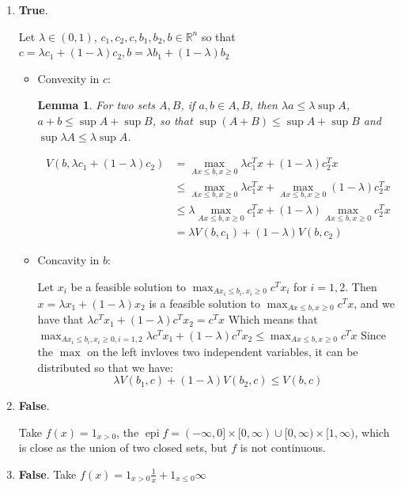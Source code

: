 \documentclass[12pt]{article}
\DeclareMathOperator{\epi}{epi}
\newtheorem{lemma}[theorem]{Lemma}
\begin{document}
\begin{enumerate}
\item[2.]
  \textbf{True}.
  
  Let $\lambda \in (0, 1)$, $c_1, c_2, c, b_1, b_2, b \in \mathbb R^n$ so that $c = \lambda c_1 + (1-\lambda)c_2, b = \lambda b_1 + (1-\lambda)b_2$
  \begin{itemize}
  \item
    Convexity in $c$:
    
    \begin{lemma}
      For two sets $A, B$, if $a, b \in A, B$, then $\lambda a \le \lambda \sup A$, $a + b \le \sup A + \sup B$, so that $\sup(A + B) \le \sup A + \sup B$ and $\sup \lambda A \le \lambda \sup A$.
    \end{lemma}

    \begin{align*}
      V(b, \lambda c_1 + (1-\lambda)c_2) &= \max_{Ax \le b, x \ge 0} \lambda c_1^T x +  (1-\lambda) c_2^Tx
      \\&\le \max_{Ax \le b, x \ge 0} \lambda c_1^T x + \max_{Ax \le b, x \ge 0} (1-\lambda) c_2^Tx
      \\&\le \lambda \max_{Ax \le b, x \ge 0} c_1^T x + (1-\lambda) \max_{Ax \le b, x \ge 0} c_2^Tx
      \\&= \lambda V(b, c_1) + (1-\lambda)V(b,c_2)
    \end{align*}

  \item Concavity in $b$:
    
    Let $x_i$ be a feasible solution to $\max_{Ax_i \le b_i, x_i \ge 0} c^Tx_i$ for $i = 1, 2$.
    Then $x = \lambda x_1 + (1-\lambda)x_2$ is a feasible solution to $\max_{Ax \le b, x \ge 0} c^Tx$, and we have that $\lambda c^Tx_1 + (1-\lambda)c^Tx_2 = c^T x$
    Which means that $\max_{Ax_i \le b_i, x_i \ge 0, i = 1, 2} \lambda c^Tx_1 + (1-\lambda) c^Tx_2 \le \max_{Ax \le b, x \ge 0} c^Tx$
    Since the  $\max$ on the left invloves two independent variables, it can be distributed so that we have:
    $$\lambda V(b_1, c) + (1-\lambda) V(b_2, c) \le V(b, c)$$
    
  \end{itemize}
\item[3.]
  \textbf{False}.
  
  Take $f(x) = 1_{x > 0}$, the $\epi f = (-\infty, 0] \times [0, \infty) \cup [0, \infty) \times [1, \infty)$, which is close as the union of two closed sets, but $f$ is not continuous.
\item[4.]
  \textbf{False}.
  Take $f(x) = 1_{x > 0} \frac{1}{x} + 1_{x \le 0} \infty$


\end{enumerate}
\end{document}
